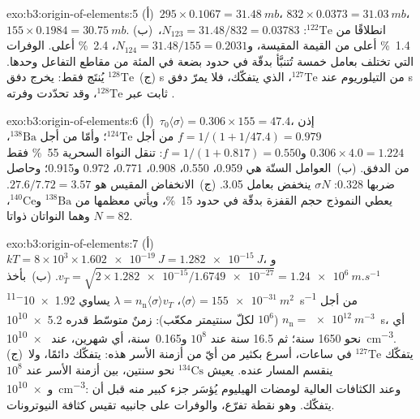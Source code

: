 \begin{solution}{exo:b3:origin-of-elements:5}
(أ)~$295\times0.1067 = \qty{31.48}{mb}$، $832\times0.0373 =
\qty{31.03}{mb}$، $155\times0.1984 = \qty{30.75}{mb}$. (ب)~انطلاقًا من
$^{122}\mathrm{Te}$: $N_{123} = 31.48/832 = \num{0.03783}$، \qty{1.4}{\percent}
أعلى من القيمة المقيسة، و$N_{124} = 31.48/155 = \num{0.2031}$،
\qty{2.4}{\percent} أعلى. الوفرات التي تختلف بعامل خمسة تُتنبَّأ
بدقّة في حدود بضعة في المئة من مقاطع التفاعل وحدها.
(ج)~$^{128}\mathrm{Te}$ يُنتَج  فقط: يخرج دفق s من التيلوريوم عند
$^{127}\mathrm{Te}$، الذي يتفكّك، فلا يمرّ دفق s ثابت عبر
$^{128}\mathrm{Te}$، وقد تحدّدت وفرته .
\end{solution}

\begin{solution}{exo:b3:origin-of-elements:6}
(أ)~$\tau_0\langle\sigma\rangle = 0.306\times155 = 47.4$، إذن
$f = 1/(1 + 1/47.4) = \num{0.979}$ من أجل $^{124}\mathrm{Te}$؛ وأمّا من أجل
$^{138}\mathrm{Ba}$، $0.306\times4.0 = 1.224$ و$f = 1/(1 + 0.817) =
\num{0.550}$: تنقل النواة السحرية \qty{55}{\percent} فقط من
الدفق. (ب)~العوامل الستّة هي \num{0.959}، \num{0.550}، \num{0.908}،
\num{0.771}، \num{0.972} و\num{0.915}؛ وحاصل ضربها \num{0.328}:
$\sigma N$ ينخفض بعامل \num{3.05}. (ج)~الانخفاض المقيس هو
$27.6/7.72 = 3.57$. يعطي النموذج حجم القفزة بدقّة في حدود
\qty{15}{\percent}، ويأتي معظمها من $^{138}\mathrm{Ba}$
و$^{140}\mathrm{Ce}$، وهما النواتان ذواتا $N = 82$.
\end{solution}

\begin{solution}{exo:b3:origin-of-elements:7}
(أ)~$kT = 8\times10^3\times\qty{1.602e-19}{J} = \qty{1.282e-15}{J}$،
و$v_T = \sqrt{2\times\num{1.282e-15}/\num{1.6749e-27}} =
\qty{1.24e6}{m.s^{-1}}$. (ب)~بأخذ $\langle\sigma\rangle =
\qty{155e-31}{m^2}$، $\lambda = n_\mathrm{n}\langle\sigma\rangle v_T$
يساوي \qty{1.92e-11}{s^{-1}} من أجل $n_\mathrm{n} = \qty{e12}{m^{-3}}$
($10^6$ لكلّ سنتيمتر مكعّب): زمنٌ متوسّط قدره \qty{5.2e10}{s}، أي نحو
\num{1650} سنة؛ ثم \num{16.5} سنة عند $10^8$ و\num{0.165}~سنة،
أي شهرين، عند \qty{e10}{cm^{-3}}. (ج)~يتفكّك $^{127}\mathrm{Te}$ في
ساعات، أسرع بكثير من أيّ من أزمنة الأسر هذه: يتفكّك دائمًا، ولا
ينقسم المسار عنده. يعيش $^{134}\mathrm{Cs}$ نحو سنتين،
بين أزمنة الأسر عند $10^8$ و\qty{e10}{cm^{-3}}: وعند
الكثافات العالية لومضات الهيليوم يُؤسَر جزء كبير منه
قبل أن يتفكّك. وهو نقطة تفرّع، والوفرات على جانبيه
تقيس كثافة النيوترونات.
\end{solution}

